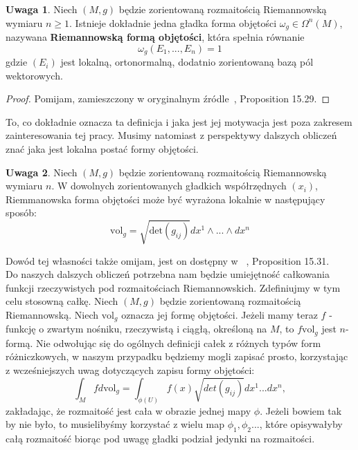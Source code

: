 \documentclass[licencjacka]{pracamgr}
\theoremstyle{definition}
\theoremstyle{definition}
\newtheorem{remark}{Uwaga}[section]
\theoremstyle{plain}
\theoremstyle{plain}
\theoremstyle{plain}
\theoremstyle{plain}
\begin{document}
\begin{remark}
Niech $(M, g)$ będzie zorientowaną rozmaitością Riemannowską wymiaru
$n \geq 1$. Istnieje dokładnie jedna gładka forma objętości
$\omega_g \in \Omega^n(M)$, nazywana \textbf{Riemannowską formą objętości},
która spełnia równanie
\[
\omega_g(E_1, ...,  E_n) = 1
\]
gdzie $(E_i)$ jest lokalną, ortonormalną, dodatnio zorientowaną bazą
pól wektorowych.
\end{remark}
\begin{proof}
Pomijam, zamieszczony w oryginalnym źródle~\cite{lee}, Proposition 15.29.
\end{proof}

To, co dokładnie oznacza ta definicja i jaka jest jej motywacja jest poza
zakresem zainteresowania tej pracy. Musimy natomiast z perspektywy
dalszych obliczeń znać jaka jest lokalna postać formy objętości.

\begin{remark}\label{expression-for-volume-form}
Niech $(M, g)$ będzie zorientowaną rozmaitością Riemannowską wymiaru $n$.
 W dowolnych zorientowanych gładkich współrzędnych
$(x_i)$, Riemmanowska forma objętości może być wyrażona lokalnie w następujący
sposób:
\[
    \text{vol}_g = \sqrt{\text{det}(g_{ij})} dx^1 \wedge ... \wedge dx^n
\]
\end{remark}
Dowód tej własności także omijam, jest on dostępny w ~\cite{lee}, Proposition
15.31. \\

Do naszych dalszych obliczeń potrzebna nam będzie umiejętność całkowania
funkcji rzeczywistych pod rozmaitościach Riemannowskich. Zdefiniujmy w tym celu
stosowną całkę.
Niech $(M, g)$ będzie zorientowaną rozmaitością Riemannowską. 
Niech $\text{vol}_g$ oznacza jej formę objętości. Jeżeli mamy teraz $f$ -
funkcję o zwartym nośniku, rzeczywistą i ciągłą, określoną na $M$, to
$f \text{vol}_g$ jest $n$-formą.
Nie odwołując się do ogólnych definicji całek z różnych typów form
różniczkowych, w naszym przypadku będziemy mogli zapisać prosto, korzystając z
wcześniejszych uwag dotyczących zapisu formy objętości:
\[ %
  \int_M f d \text{vol}_g = \int_{\phi (U)} f(x) \sqrt{det(g_{ij})} dx^1 ... dx^n,
\]
zakładając, że rozmaitość jest cała w obrazie jednej mapy
$\phi$. Jeżeli bowiem tak by nie było, to musielibyśmy korzystać z
wielu map $\phi_1, \phi_2 ... $, które opisywałyby całą rozmaitość
biorąc pod uwagę gładki podział jedynki na rozmaitości. \\
\end{document}
